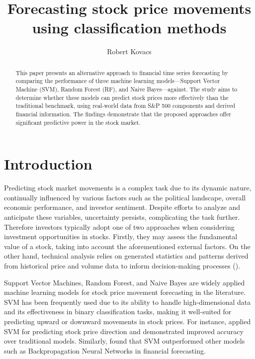 \documentclass[aodsor,preprint]{imsart}
\numberwithin{equation}{section}
\theoremstyle{plain}
\begin{document}
\begin{frontmatter}
\title{Forecasting stock price movements using classification methods}
\author{Robert Kovacs}

\begin{abstract}
This paper presents an alternative approach to financial time series forecasting by comparing the performance of three machine learning models—Support Vector Machine (SVM), Random Forest (RF), and Naive Bayes—against. The study aims to determine whether these models can predict stock prices more effectively than the traditional benchmark, using real-world data from S\&P 500 components and derived financial information. The findings demonstrate that the proposed approaches offer significant predictive power in the stock market.
\end{abstract}


\begin{keyword}
\end{keyword}

\end{frontmatter}

\section{Introduction} 

Predicting stock market movements is a complex task due to its dynamic nature, continually influenced by various factors such as the political landscape, overall economic performance, and investor sentiment. Despite efforts to analyze and anticipate these variables, uncertainty persists, complicating the task further. Therefore investors typically adopt one of two approaches when considering investment opportunities in stocks. Firstly, they may assess the fundamental value of a stock, taking into account the aforementioned external factors. On the other hand, technical analysis relies on generated statistics and patterns derived from historical price and volume data to inform decision-making processes (\cite{Kara2011}).

Support Vector Machines, Random Forest, and Naive Bayes are widely applied machine learning models for stock price movement forecasting in the literature. SVM has been frequently used due to its ability to handle high-dimensional data and its effectiveness in binary classification tasks, making it well-suited for predicting upward or downward movements in stock prices. For instance, \cite{kim2003} applied SVM for predicting stock price direction and demonstrated improved accuracy over traditional models. Similarly, \cite{huang2005} found that SVM outperformed other models such as Backpropagation Neural Networks in financial forecasting.
\end{document}
